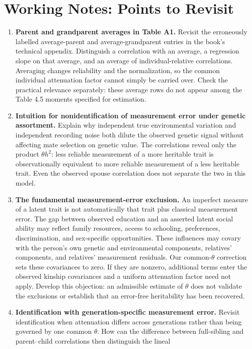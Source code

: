 \documentclass[12pt]{article}
\renewenvironment{itemize}{\begin{enumerate}}{\end{enumerate}}
\begin{document}
\section*{Working Notes: Points to Revisit}
\begin{itemize}
\item \textbf{Parent and grandparent averages in Table A1.}
Revisit the erroneously labelled average-parent and average-grandparent
entries in the book's technical appendix. Distinguish a correlation with
an average, a regression slope on that average, and an average of
individual-relative correlations. Averaging changes reliability and the
normalization, so the common individual attenuation factor cannot simply
be carried over. Check the practical relevance separately: these average
rows do not appear among the Table 4.5 moments specified for estimation.
\item \textbf{Intuition for nonidentification of measurement error under
genetic assortment.} Explain why independent true environmental variation
and independent recording noise both dilute the observed genetic signal
without affecting mate selection on genetic value. The correlations reveal
only the product $\theta h^2$: less reliable measurement of a more
heritable trait is observationally equivalent to more reliable measurement
of a less heritable trait. Even the observed spouse correlation does not
separate the two in this model.
\item \textbf{The fundamental measurement-error exclusion.}
An imperfect measure of a latent trait is not automatically that trait
plus classical measurement error. The gap between observed education and
an asserted latent social ability may reflect family resources, access
to schooling, preferences, discrimination, and sex-specific opportunities.
These influences may covary with the person's own genetic and environmental
components, relatives' components, and relatives' measurement residuals.
Our common-$\theta$ correction sets these covariances to zero. If they
are nonzero, additional terms enter the observed kinship covariances and
a uniform attenuation factor need not apply. Develop this objection:
an admissible estimate of $\theta$ does not validate the exclusions or
establish that an error-free heritability has been recovered.
\item \textbf{Identification with generation-specific measurement error.}
Revisit identification when attenuation differs across generations rather
than being governed by one common $\theta$. How can the difference between
full-sibling and parent--child correlations then distinguish the lineal

\end{itemize}
\end{document}
